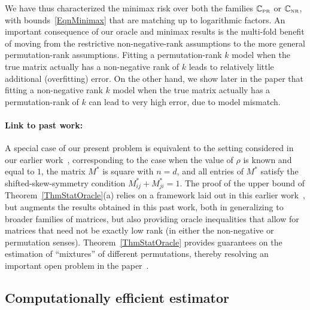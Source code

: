 \documentclass[11pt, hidelinks]{article} %
\newcommand{\arxiv}[1]{#1}
\newcommand{\nips}[1]{}
\newcommand{\numrows}{n}
\newcommand{\numcols}{d}
\newcommand{\wtmatrix}{M}
\newcommand{\wtstar}{\wtmatrix^*}
\newcommand{\matrixset}{\mathbb{C}}
\newcommand{\nnset}{\matrixset_{\mbox{\tiny NR}}}
\newcommand{\permset}{\matrixset_{\mbox{\tiny PR}}}
\newcommand{\permrank}{\rho}
\newcommand{\temprank}{k}
\begin{document}
We have thus characterized the minimax risk over both the families
$\permset$ or $\nnset$, with bounds~\eqref{EqnMinimax} that are matching up to
logarithmic factors. An important consequence of our oracle and
minimax results is the multi-fold benefit of moving from the
restrictive non-negative-rank assumptions to the more general
permutation-rank assumptions. Fitting a permutation-rank $\temprank$
model when the true matrix actually has a non-negative rank of
$\temprank$ leads to relatively little additional (overfitting)
error. On the other hand, we show later in the paper that fitting a
non-negative rank $\temprank$ model when the true matrix actually has
a permutation-rank of $\temprank$ can lead to very high error, due to
model mismatch.


\paragraph{Link to past work:}
A special case of our present problem is equivalent to the setting
considered in \arxiv{our earlier work}\nips{the
  paper}~\cite{shah2015stochastically}, corresponding to the case when
the value of $\permrank$ is known and equal to $1$, the matrix
$\wtstar$ is square with $\numrows = \numcols$, and all entries of
$\wtstar$ satisfy the shifted-skew-symmetry condition $\wtstar_{ij} +
\wtstar_{ji} = 1$. The proof of the upper bound of
Theorem~\ref{ThmStatOracle}(a) relies on a framework laid out in this
earlier work~\cite{shah2015stochastically}, but augments the results
obtained in this past work, both in generalizing to broader families
of matrices, but also providing oracle inequalities that allow for
matrices that need not be exactly low rank (in either the non-negative
or permutation senses). Theorem~\ref{ThmStatOracle} provides
guarantees on the estimation of ``mixtures'' of different
permutations, thereby resolving an important open problem in the
paper~\cite{shah2015stochastically}.


\subsection{Computationally efficient estimator}
\end{document}
